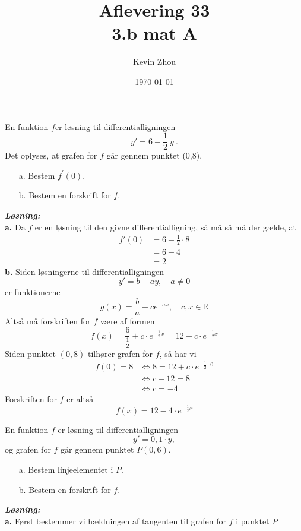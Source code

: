 \documentclass{article}
\title{Aflevering 33\\
{\Large \textbf{3.b mat A}}}
\author{Kevin Zhou}
\date{\today}
\newcommand{\sol}{\setlength{\parindent}{0cm}\textbf{\textit{Løsning:}}\setlength{\parindent}{1cm}}
\begin{document}
\maketitle
\pagebreak
\begin{question}{}{}
  En funktion $f$er løsning til differentialligningen
  $$y'=6-\frac{1}{2}\:y\:.$$
  Det oplyses, at grafen for $f$ går gennem punktet (0,8).
\begin{itemize}
  \item[a.] Bestem $f^{\prime}(0).$
  \item[b.] Bestem en forskrift for $f.$
\end{itemize}
\end{question}
\sol \\
\textbf{a.}
Da $f$ er en løsning til den givne differentialligning, så må så må der gælde, at
\begin{equation*}
\begin{split}
  f'(0)&=6-\frac{1}{2} \cdot 8\\
  &=6-4\\
  &=2
\end{split}
\end{equation*}
\textbf{b.}
Siden løsningerne til differentialligningen
\[
y'=b-ay, \quad a \neq 0
\] 
er funktionerne
\[
g(x)=\frac{b}{a} + c e^{-ax}, \quad c,x \in \mathbb{R}
\] 
Altså må forskriften for $f$ være af formen
\[
f(x)=\frac{6}{\frac{1}{2}}+c \cdot e^{-\frac{1}{2}x} =12 +c \cdot e^{-\frac{1}{2}x} 
\] 
Siden punktet $(0,8)$ tilhører grafen for $f$, så har vi
\begin{equation*}
\begin{split}
  f(0)= 8 &\iff 8=12 + c \cdot e^{-\frac{1}{2} \cdot 0} \\
  &\iff c+12=8\\
  &\iff c=-4
\end{split}
\end{equation*}
Forskriften for $f$ er altså
\[
f(x)=12-4 \cdot e^{-\frac{1}{2}x} 
\] 
\begin{question}{}{}
  En funktion $f$ er løsning til differentialligningen
$$y'=0,1\cdot y,$$
og grafen for $f$ går gennem punktet $P(0,6).$
\begin{itemize}
  \item[a.] Bestem linjeelementet i $P.$
  \item[b.] Bestem en forskrift for $f.$
\end{itemize}
\end{question}
\sol \\
\textbf{a.}
Først bestemmer vi hældningen af tangenten til grafen for $f$ i punktet $P$
\end{document}
